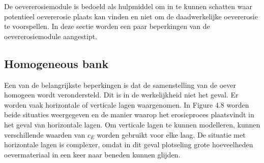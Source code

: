 De oevererosiemodule is bedoeld als hulpmiddel om in te kunnen schatten waar potentieel oevererosie plaats kan vinden en niet om de daadwerkelijke oevererosie te voorspellen.
In deze sectie worden een paar beperkingen van de oevererosiemodule aangestipt.

\subsection{Homogeneous bank}

Een van de belangrijkste beperkingen is dat de samenstelling van de oever homogeen wordt verondersteld.
Dit is in de werkelijkheid niet het geval.
Er worden vaak horizontale of verticale lagen waargenomen.
In Figure 4.8 worden beide situaties weergegeven en de manier waarop het erosieproces plaatsvindt in het geval van horizontale lagen.
Om verticale lagen te kunnen modelleren, kunnen verschillende waarden van $c_E$ worden gebruikt voor elke laag.
De situatie met horizontale lagen is complexer, omdat in dit geval plotseling grote hoeveelheden oevermateriaal in een keer naar beneden kunnen glijden.

